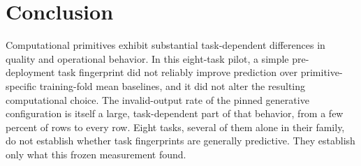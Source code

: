 \section{Conclusion}
\label{sec:conclusion}

Computational primitives exhibit substantial task-dependent differences in quality and operational behavior. In this eight-task pilot, a simple pre-deployment task fingerprint did not reliably improve prediction over primitive-specific training-fold mean baselines, and it did not alter the resulting computational choice. The invalid-output rate of the pinned generative configuration is itself a large, task-dependent part of that behavior, from a few percent of rows to every row. Eight tasks, several of them alone in their family, do not establish whether task fingerprints are generally predictive. They establish only what this frozen measurement found.
